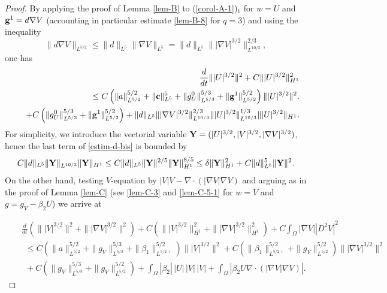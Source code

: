 \documentclass[11pt,reqno]{amsart}%
\numberwithin{equation}{section}
\begin{document}
{\begin{proof}
By applying the proof of Lemma \ref{lem-B} to (\ref{corol-A-1})$_1$ for $w=U$ and ${\bf g}^1=d \nabla V$ (accounting in particular estimate \eqref{lem-B-8} for $q=3$)  and using the inequality 
$$\|d \nabla V\|_{L^{5/2}}
\le \|d\|_{L^{5}} \|\nabla V\|_{L^5}
= \|d\|_{L^{5}} \||\nabla V|^{3/2}\|_{L^{10/3}}^{2/3},
$$ 
one has
%
\begin{eqnarray}
&&\frac{d}{dt}\||U|^{ 3/2}\|^2 +
C\||U|^{3/2}\|^2_{H^1}
\nonumber\\
&&\ \ \le C\left(\| a\|^{5/2}_{L^{5/2}}+\|{\bf c}\|^5_{L^5}
+
 \|g^0_U\|_{L^{5/3}}^{5/3}
+
 \|{\bf g}^1\|^{5/2}_{L^{5/2}}
\right)
\||U|^{3/2}\|^2. 
 \label{estim-d-bis}
\\
&& \nonumber
\ \ +C\left(
\|g^0_U\|_{L^{5/3}}^{5/3}
+
\|{\bf g}^1\|^{5/2}_{L^{5/2}}
\right)
+
\|d\|_{L^{5}}
\||\nabla V|^{3/2}\|_{L^{10/3}}^{2/3}
\||U|^{3/2}\|_{L ^{10/3}}^{1/3} \||U|^{3/2}\|_{H^1}.
\label{corol-A-3-1-bis}
\end{eqnarray}
For simplicity, we introduce the vectorial variable 
${\bf Y}=(
|U|^{3/2},
|V|^{3/2},|\nabla V|^{3/2})$, hence the last term of \eqref{estim-d-bis} is bounded by 
\begin{equation} \label{estim-d}
C \|d\|_{L^{5}} 
\| {\bf Y} \|_{L ^{10/3}} \| {\bf Y} \|_{H^1}
\le C \|d\|_{L^{5}} \| {\bf Y} \|^{2/5} \| {\bf Y} \|_{H^1}^{8/5}
\le \delta  \| {\bf Y} \|_{H^1}^{2} + C \|d\|_{L^{5}}^5 \| {\bf Y} \|^{2}.
\end{equation}
On the other hand, testing $V$-equation by $|V|V-\nabla\cdot(|\nabla V|\nabla V)$ and arguing as in  the proof of Lemma \ref{lem-C} (see \eqref{lem-C-3} and \eqref{lem-C-5-1}
 for $w=V$ and $g=g_V-\beta_2 U$) we arrive at 

\begin{eqnarray}\label{corol-A-6}
&&\frac{d}{dt}\left(\||V|^{3/2}\|^2+\||\nabla V|^{3/2}\|^2\right)
+C\left(\||V|^{3/2}\|_{H^1}^2+\||\nabla V|^{3/2}\|^2_{H^1}\right)+C\int_\Omega|\nabla V||D^2 V|^2\nonumber\\
&&\ \ \le C\left(\| a\|^{5/2}_{L^{5/2}}+\|g_V\|^{5/3}_{L^{5/3}}
+\| \beta_1\|^{5/2}_{L^{5/2+}}
\right)\||V|^{3/2}\|^2
+C\left(\|\beta_1\|^{5/2}_{L^{5/2+}}+\|g_V\|^{5/2}_{L^{5/2}}
\right)\||\nabla V|^{3/2}\|^2\nonumber\\
&&\  \ +C\left(\|g_V\|^{5/3}_{L^{5/3}}+\|g_V\|^{5/2}_{L^{5/2}}\right)
+\int_\Omega |\beta_2|\, |U|\,|V|\,|V|+\int_\Omega|\beta_2U\nabla\cdot(|\nabla V|\nabla V)|.
\end{eqnarray}


\end{proof}}
\end{document}
